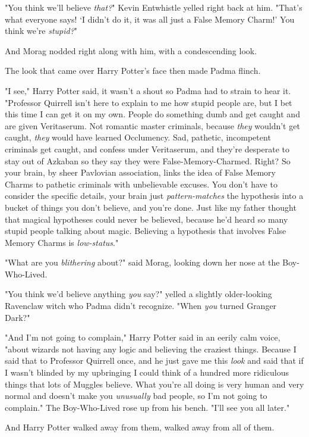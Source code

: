 "You think we'll believe \emph{that?}" Kevin Entwhistle yelled right back at
him. "That's what everyone says! `I didn't do it, it was all just a False
Memory Charm!' You think we're \emph{stupid?}"

And Morag nodded right along with him, with a condescending look.

The look that came over Harry Potter's face then made Padma flinch.

"I see," Harry Potter said, it wasn't a shout so Padma had to strain to hear
it. "Professor Quirrell isn't here to explain to me how stupid people are, but
I bet this time I can get it on my own. People do something dumb and get caught
and are given Veritaserum. Not romantic master criminals, because \emph{they}
wouldn't get caught, \emph{they} would have learned Occlumency. Sad, pathetic,
incompetent criminals get caught, and confess under Veritaserum, and they're
desperate to stay out of Azkaban so they say they were False-Memory-Charmed.
Right? So your brain, by sheer Pavlovian association, links the idea of False
Memory Charms to pathetic criminals with unbelievable excuses. You don't have
to consider the specific details, your brain just \emph{pattern-matches} the
hypothesis into a bucket of things you don't believe, and you're done. Just
like my father thought that magical hypotheses could never be believed, because
he'd heard so many stupid people talking about magic. Believing a hypothesis
that involves False Memory Charms is \emph{low-status}."

"What are you \emph{blithering} about?" said Morag, looking down her nose at
the Boy-Who-Lived.

"You think we'd believe anything \emph{you} say?" yelled a slightly
older-looking Ravenclaw witch who Padma didn't recognize. "When \emph{you}
turned Granger Dark?"

"And I'm not going to complain," Harry Potter said in an eerily calm voice,
"about wizards not having any logic and believing the craziest things. Because
I said that to Professor Quirrell once, and he just gave me this \emph{look}
and said that if I wasn't blinded by my upbringing I could think of a hundred
more ridiculous things that lots of Muggles believe. What you're all doing is
very human and very normal and doesn't make you \emph{unusually} bad people, so
I'm not going to complain." The Boy-Who-Lived rose up from his bench. "I'll see
you all later."

And Harry Potter walked away from them, walked away from all of them.

